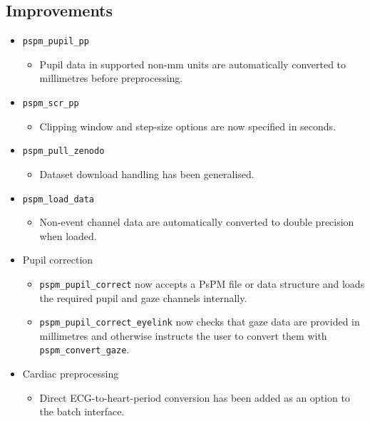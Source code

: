 \documentclass[english]{article}
\numberwithin{equation}{section}
\numberwithin{figure}{section}
\begin{document}
\subsection*{Improvements}
\begin{itemize}

\item \texttt{pspm\_pupil\_pp}
\begin{itemize}
\item Pupil data in supported non-mm units are automatically converted to millimetres before preprocessing.
\end{itemize}

\item \texttt{pspm\_scr\_pp}
\begin{itemize}
\item Clipping window and step-size options are now specified in seconds.
\end{itemize}

\item \texttt{pspm\_pull\_zenodo}
\begin{itemize}
\item Dataset download handling has been generalised.
\end{itemize}

\item \texttt{pspm\_load\_data}
\begin{itemize}
\item Non-event channel data are automatically converted to double precision when loaded.
\end{itemize}

\item Pupil correction
\begin{itemize}
\item \texttt{pspm\_pupil\_correct} now accepts a PsPM file or data structure and loads the required pupil and gaze channels internally.
\item \texttt{pspm\_pupil\_correct\_eyelink} now checks that gaze data are provided in millimetres and otherwise instructs the user to convert them with \texttt{pspm\_convert\_gaze}.
\end{itemize}

\item Cardiac preprocessing
\begin{itemize}
\item Direct ECG-to-heart-period conversion has been added as an option to the batch interface.
\end{itemize}


\end{itemize}
\end{document}
